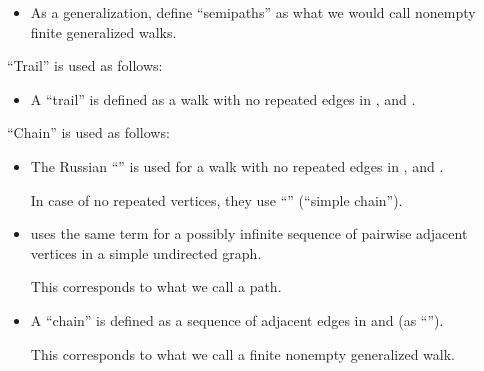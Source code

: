 \begin{remark}
\begin{thmenum}
\begin{itemize}
      \item As a generalization, \textcite[def. 1.1.3]{Knauer2019AlgebraicGraphTheory} define \enquote{semipaths} as what we would call nonempty finite generalized walks.
    \end{itemize}

     \enquote{Trail} is used as follows:
    \begin{itemize}
      \item A \enquote{trail} is defined as a walk with no repeated edges in
      \cite[13]{Harary1969GraphTheory},
      \cite[571]{Stanley2012EnumerativeCombinatoricsVol1} and
      \cite[5]{Bollobás1998ModernGraphTheory}.
    \end{itemize}

     \enquote{Chain} is used as follows:
    \begin{itemize}
      \item The Russian \enquote{} is used for a walk with no repeated edges in
      \cite[128]{Зыков2004ТеорияГрафов},
      \cite[22]{ЕмеличевИПр1990ТеорияГрафов} and
      \cite[\S 7.2.3]{Новиков2013ДискретнаяМатематика}.

      In case of no repeated vertices, they use \enquote{} (\enquote{simple chain}).

      \item \Textcite[278]{БелоусовТкачёв2004ДискретнаяМатематика} uses the same term for a possibly infinite sequence of pairwise adjacent vertices in a simple undirected graph.

      This corresponds to what we call a path.

      \item A \enquote{chain} is defined as a sequence of adjacent edges in
      \cite[12]{GondranMinoux1984GraphsAndAlgorithms} and
      \cite[10]{Мирчев2001Графи} (as \enquote{}).

      This corresponds to what we call a finite nonempty generalized walk.
    \end{itemize}
  \end{thmenum}
\end{remark}

